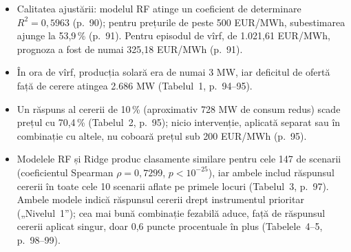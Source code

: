 \textbf{}
\begin{itemize}
\item {}%
{Calitatea ajustării: modelul RF atinge un coeficient de determinare $R^2 = 0{,}5963$ (p.~90); pentru prețurile de peste 500 EUR/MWh, subestimarea ajunge la 53,9\,\% (p.~91).
Pentru episodul de vîrf, de 1.021,61 EUR/MWh, prognoza a fost de numai 325,18 EUR/MWh (p.~91).}
\item {}%
{În ora de vîrf, producția solară era de numai 3 MW, iar deficitul de ofertă față de cerere atingea 2.686 MW (Tabelul~1, p.~94--95).}
\item {}%
{Un răspuns al cererii de 10\,\% (aproximativ 728 MW de consum redus) scade prețul cu 70,4\,\% (Tabelul~2, p.~95);
nicio intervenție, aplicată separat sau în combinație cu altele, nu coboară prețul sub 200 EUR/MWh (p.~95).}
\item {}%
{Modelele RF și Ridge produc clasamente similare pentru cele 147 de scenarii (coeficientul Spearman $\rho = 0{,}7299$, $p<10^{-25}$), iar ambele includ răspunsul cererii în toate cele 10 scenarii aflate pe primele locuri (Tabelul~3, p.~97).
Ambele modele indică răspunsul cererii drept instrumentul prioritar („Nivelul~1”); cea mai bună combinație fezabilă aduce, față de răspunsul cererii aplicat singur, doar 0,6 puncte procentuale în plus (Tabelele~4--5, p.~98--99).}
\end{itemize}

